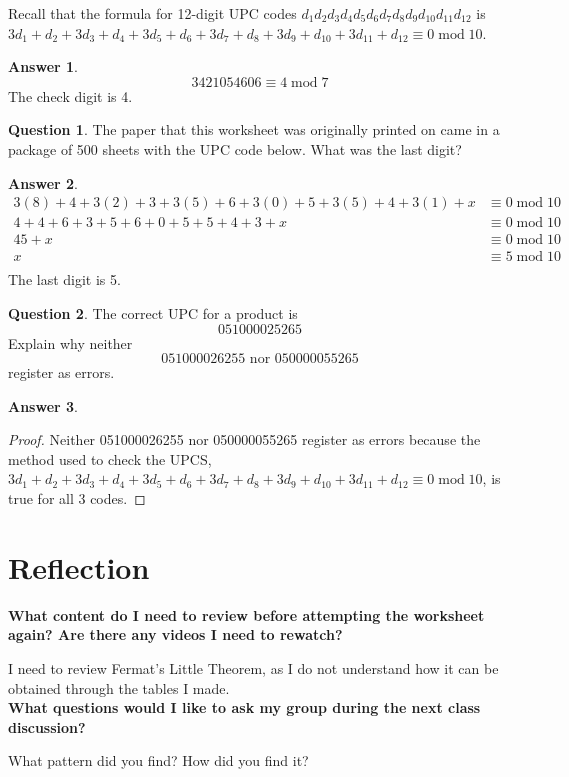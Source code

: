 \documentclass[article, 12pt]{article}
\theoremstyle{definition}
\newtheorem{question}{Question}
\newtheorem{answer}{Answer}
\newcommand{\Mod}[1]{\;\mathrm{mod}\; #1} %
\begin{document}
    Recall that the formula for 12-digit UPC codes $d_1d_2d_3d_4d_5d_6d_7d_8d_9d_{10}d_{11}d_{12}$ is $3d_1 + d_2 + 3d_3 + d_4 + 3d_5 + d_6 + 3d_7 + d_8 + 3d_9 + d_{10} + 3d_{11} + d_{12} \equiv 0 \Mod{10}$.

    \begin{answer}
        \[ 3421054606 \equiv 4 \Mod{7} \]
        The check digit is 4.   
    \end{answer}

    \begin{question}
        The paper that this worksheet was originally printed on came in a package of 500 sheets with the UPC code below. What was the last digit?
    \end{question}

    \begin{answer}
        \begin{align*}
            3(8) + 4 + 3(2) + 3 + 3(5) + 6 + 3(0) + 5 + 3(5) + 4 + 3(1) + x &\equiv 0 \Mod{10} \\
            4 + 4 + 6 + 3 + 5 + 6 + 0 + 5 + 5 + 4 + 3 + x &\equiv 0 \Mod{10} \\
            45 + x &\equiv 0 \Mod{10} \\
            x &\equiv 5 \Mod{10} \\
        \end{align*}
        The last digit is 5.
    \end{answer}

    \begin{question}
        The correct UPC for a product is
        \[ 051000025265 \]
        Explain why neither
        \[ 051000026255 \text{ nor } 050000055265 \]
        register as errors.
    \end{question}

    \begin{answer}
        \begin{proof}
            Neither 051000026255 nor 050000055265 register as errors because the method used to check the UPCS, $3d_1 + d_2 + 3d_3 + d_4 + 3d_5 + d_6 + 3d_7 + d_8 + 3d_9 + d_{10} + 3d_{11} + d_{12} \equiv 0 \Mod{10}$, is true for all 3 codes.
        \end{proof}
    \end{answer}

    \section{Reflection}
    \textbf{What content do I need to review before attempting the worksheet again? Are there any videos I need to rewatch?}

    I need to review Fermat's Little Theorem, as I do not understand how it can be obtained through the tables I made.
    \\[12pt]
    \textbf{What questions would I like to ask my group during the next class discussion?}

    What pattern did you find? How did you find it?
\end{document}
